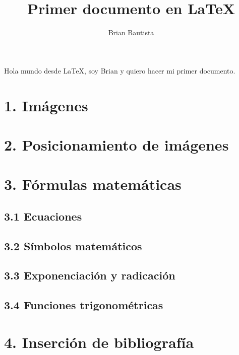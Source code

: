 \documentclass[letterpaper]{article}
\title{Primer documento en \LaTeX}
\author{Brian Bautista}
\begin{document}
    \maketitle
    Hola mundo desde \LaTeX, soy Brian y quiero hacer mi primer documento.

    \section*{1. Im\'agenes}
    
    \section*{2. Posicionamiento de im\'agenes}

    \section*{3. F\'ormulas matem\'aticas}

        \subsection*{3.1 Ecuaciones}
        \subsection*{3.2 S\'imbolos matem\'aticos}
        \subsection*{3.3 Exponenciaci\'on y radicaci\'on}
        \subsection*{3.4 Funciones trigonom\'etricas}

    \section*{4. Inserci\'on de bibliograf\'ia}
\end{document}
